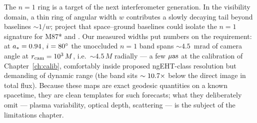 The $n = 1$ ring is a target of the next interferometer generation. In
the visibility domain, a thin ring of angular width $w$ contributes a
slowly decaying tail beyond baselines $\sim 1/w$; \citet{Johnson2020}
project that space--ground baselines could isolate the $n = 1$
signature for M87* and \sgra{}. Our measured widths put numbers on the
requirement: at $a_* = 0.94$, $i = 80^\circ$ the unoccluded $n = 1$
band spans $\sim 4.5$~mrad of camera angle at $r_{\rm cam} = 10^3\,M$,
i.e.\ $\sim 4.5\,M$ radially — a few $\mu\mathrm{as}$ at the \sgra{} calibration
of Chapter~\ref{ch:calib}, comfortably inside proposed ngEHT-class
resolution but demanding of dynamic range (the band sits
$\sim10.7\times$ below the direct image in total flux).
Because these maps are exact geodesic quantities on a known spacetime,
they are clean templates for such forecasts; what they deliberately
omit — plasma variability, optical depth, scattering — is the subject
of the limitations chapter.
